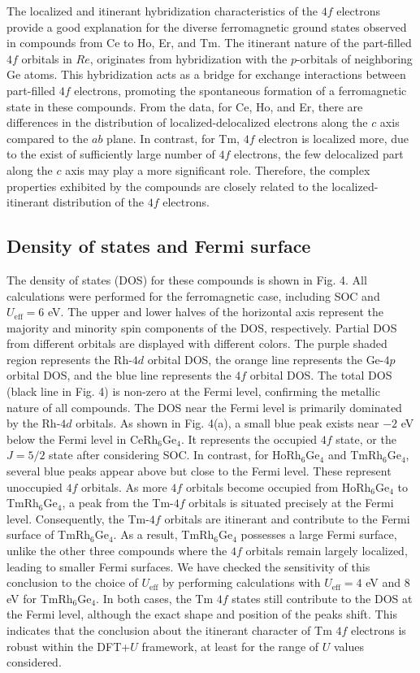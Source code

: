 \documentclass[preprint,12pt]{elsarticle}
\begin{document}
The localized and itinerant hybridization characteristics of the $4f$ electrons provide a good explanation for the diverse ferromagnetic ground states observed in compounds from Ce to Ho, Er, and Tm. The itinerant nature of the part-filled $4f$ orbitals in $Re$, originates from hybridization with the $p$-orbitals of neighboring Ge atoms. This hybridization acts as a bridge for exchange interactions between part-filled $4f$ electrons, promoting the spontaneous formation of a ferromagnetic state in these compounds. From the data, for Ce, Ho, and Er, there are differences in the distribution of localized-delocalized electrons along the $c$ axis compared to the $ab$ plane. In contrast, for Tm, $4f$ electron is localized more, due to the exist of sufficiently large number of $4f$ electrons, the few delocalized part along the $c$ axis may play a more significant role. Therefore, the complex properties exhibited by the compounds are closely related to the localized-itinerant distribution of the $4f$ electrons.

\subsection{Density of states and Fermi surface}

The density of states (DOS) for these compounds is shown in Fig. 4. All calculations were performed for the ferromagnetic case, including SOC and $U_{\text{eff}} = 6$ eV. The upper and lower halves of the horizontal axis represent the majority and minority spin components of the DOS, respectively. Partial DOS from different orbitals are displayed with different colors. The purple shaded region represents the Rh-$4d$ orbital DOS, the orange line represents the Ge-$4p$ orbital DOS, and the blue line represents the $4f$ orbital DOS. The total DOS (black line in Fig. 4) is non-zero at the Fermi level, confirming the metallic nature of all compounds. The DOS near the Fermi level is primarily dominated by the Rh-$4d$ orbitals. As shown in Fig. 4(a), a small blue peak exists near $-2$ eV below the Fermi level in CeRh$_6$Ge$_4$. It represents the occupied $4f$ state, or the $J = 5/2$ state after considering SOC. In contrast, for HoRh$_6$Ge$_4$ and TmRh$_6$Ge$_4$, several blue peaks appear above but close to the Fermi level. These represent unoccupied $4f$ orbitals. As more $4f$ orbitals become occupied from HoRh$_6$Ge$_4$ to TmRh$_6$Ge$_4$, a peak from the Tm-$4f$ orbitals is situated precisely at the Fermi level. Consequently, the Tm-$4f$ orbitals are itinerant and contribute to the Fermi surface of TmRh$_6$Ge$_4$. As a result, TmRh$_6$Ge$_4$ possesses a large Fermi surface, unlike the other three compounds where the $4f$ orbitals remain largely localized, leading to smaller Fermi surfaces. We have checked the sensitivity of this conclusion to the choice of $U_{\text{eff}}$ by performing calculations with $U_{\text{eff}} = 4$ eV and $8$ eV for TmRh$_6$Ge$_4$. In both cases, the Tm $4f$ states still contribute to the DOS at the Fermi level, although the exact shape and position of the peaks shift. This indicates that the conclusion about the itinerant character of Tm $4f$ electrons is robust within the DFT+$U$ framework, at least for the range of $U$ values considered.
\end{document}
